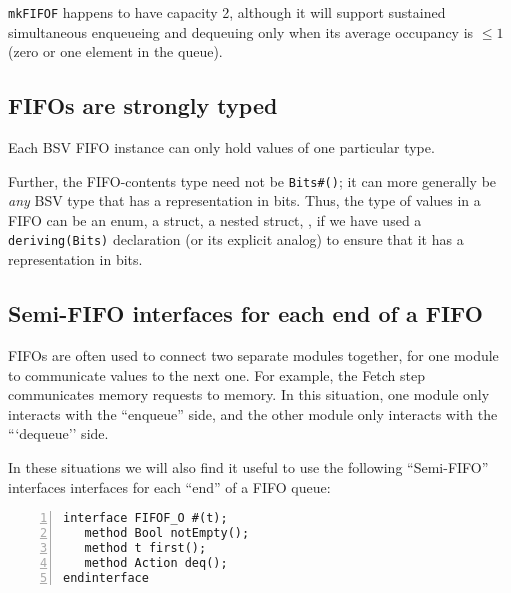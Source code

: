 {\tt mkFIFOF} happens to have capacity 2, although it will support
sustained simultaneous enqueueing and dequeuing only when its average
occupancy is $\leq 1$ (zero or one element in the queue).


\subsection{FIFOs are strongly typed}


Each BSV FIFO instance can only hold values of one particular type.

Further, the FIFO-contents type need not be \verb|Bits#()|; it can
more generally be \emph{any} BSV type that has a representation in
bits.  Thus, the type of values in a FIFO can be an enum, a struct, a
nested struct, {\etc}, if we have used a \verb|deriving(Bits)|
declaration (or its explicit analog) to ensure that it has a
representation in bits.


\subsection{Semi-FIFO interfaces for each end of a FIFO}

FIFOs are often used to connect two separate modules together, for one
module to communicate values to the next one.  For example, the Fetch
step communicates memory requests to memory.  In this situation, one
module only interacts with the ``enqueue'' side, and the other module
only interacts with the ```dequeue'' side.

In these situations we will also find it useful to use the following
``Semi-FIFO'' interfaces interfaces for each ``end'' of a FIFO queue:


{\small
\begin{Verbatim}[frame=single, numbers=left]
interface FIFOF_O #(t);
   method Bool notEmpty();
   method t first();
   method Action deq();
endinterface
\end{Verbatim}
}


